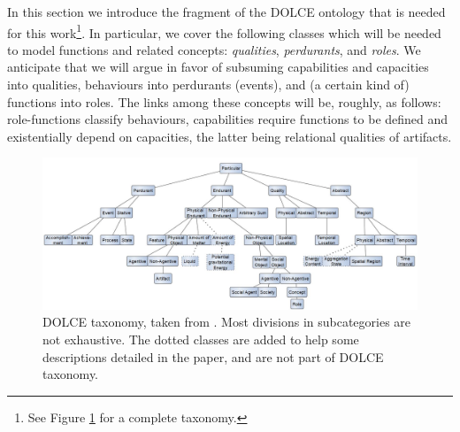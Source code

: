 \documentclass[sw]{iosart2x}
\newcommand{\DOLCE}{\textsc{DOLCE}\xspace} %
\newcommand{\firstTimeKeyWord}[1]{\textit{#1}}
\begin{document}
In this section we introduce the fragment of the \DOLCE ontology \cite{masoloWonderWebDeliverableD182003,borgoDOLCEDescriptiveOntology2022} that is needed for this work\footnote{See Figure \ref{fig:DOLCE-taxa} for a complete taxonomy.}. In particular, we cover the following classes which will be needed to model functions and related concepts: \firstTimeKeyWord{qualities}, \firstTimeKeyWord{perdurants}, and \firstTimeKeyWord{roles}. 
We anticipate that we will argue in favor of subsuming capabilities and capacities into qualities, behaviours into perdurants (events), and (a certain kind of) functions into roles. The links among these concepts will be, roughly, as follows: role-functions classify behaviours, 
capabilities require functions to be defined and existentially depend on capacities, the latter being relational qualities of artifacts.

\begin{figure}
  \centering
  \includegraphics[width=\textwidth]{DOLCE-taxav2.JPG}
  \caption{\label{fig:DOLCE-taxa} \DOLCE taxonomy, taken from \cite{borgoDOLCEDescriptiveOntology2022}. Most divisions in subcategories are not exhaustive. The dotted classes are added to help some descriptions detailed in the paper, and are not part of \DOLCE taxonomy.}
\end{figure}
\end{document}
